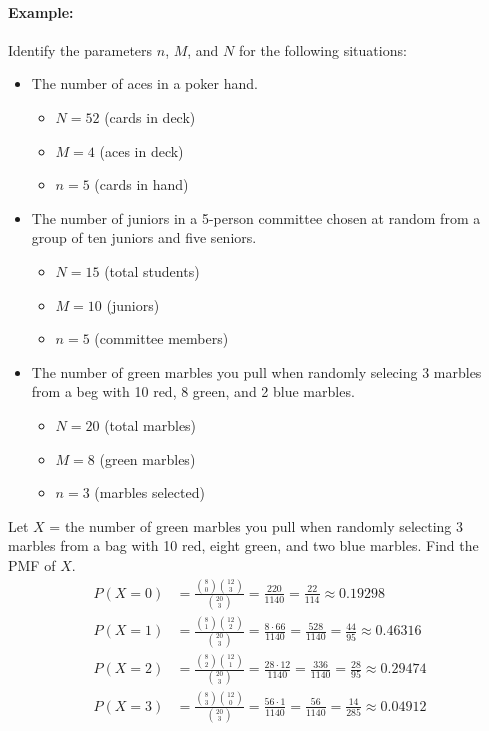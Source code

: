 \paragraph*{Example:}
Identify the parameters $n$, $M$, and $N$ for the following situations:
\begin{itemize}
    \item The number of aces in a poker hand.
    \begin{itemize}
        \item $N=52$ (cards in deck)
        \item $M=4$ (aces in deck)
        \item $n=5$ (cards in hand)
    \end{itemize}
    \item The number of juniors in a 5-person committee chosen at random from a group of ten juniors and five seniors.
    \begin{itemize}
        \item $N=15$ (total students)
        \item $M=10$ (juniors)
        \item $n=5$ (committee members)
    \end{itemize}
    \item The number of green marbles you pull when randomly selecing 3 marbles from  a beg with 10 red,  8 green, and 2 blue marbles.
    \begin{itemize}
        \item $N=20$ (total marbles)
        \item $M=8$ (green marbles)
        \item $n=3$ (marbles selected)
    \end{itemize}
\end{itemize}

Let $X$ = the number of green marbles you pull when randomly selecting 3 marbles from a bag with 10 red, eight green, and two blue marbles.
Find the PMF of $X$.
\begin{align*}
    P(X=0) &= \frac{\binom{8}{0} \binom{12}{3}}{\binom{20}{3}} = \frac{220}{1140} = \frac{22}{114} \approx 0.19298 \\
    P(X=1) &= \frac{\binom{8}{1} \binom{12}{2}}{\binom{20}{3}} = \frac{8 \cdot 66}{1140} = \frac{528}{1140} = \frac{44}{95} \approx 0.46316 \\
    P(X=2) &= \frac{\binom{8}{2} \binom{12}{1}}{\binom{20}{3}} = \frac{28 \cdot 12}{1140} = \frac{336}{1140} = \frac{28}{95} \approx 0.29474 \\
    P(X=3) &= \frac{\binom{8}{3} \binom{12}{0}}{\binom{20}{3}} = \frac{56 \cdot 1}{1140} = \frac{56}{1140} = \frac{14}{285} \approx 0.04912
\end{align*}

